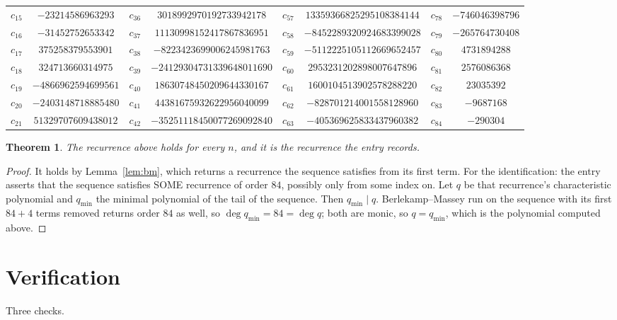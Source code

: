 \documentclass[11pt,a4paper]{article}
\theoremstyle{plain}
\newtheorem{theorem}{Theorem}
\theoremstyle{definition}
\begin{document}
\begin{center}
\begin{tabular}{cccccccc}
$c_{15}$ & $-23214586963293$ & $c_{36}$ & $3018992970192733942178$ & $c_{57}$ & $13359366825295108384144$ & $c_{78}$ & $-746046398796$ \\
$c_{16}$ & $-31452752653342$ & $c_{37}$ & $11130998152417867836951$ & $c_{58}$ & $-8452289320924683399028$ & $c_{79}$ & $-265764730408$ \\
$c_{17}$ & $375258379553901$ & $c_{38}$ & $-8223423699006245981763$ & $c_{59}$ & $-5112225105112669652457$ & $c_{80}$ & $4731894288$ \\
$c_{18}$ & $324713660314975$ & $c_{39}$ & $-24129304731339648011690$ & $c_{60}$ & $2953231202898007647896$ & $c_{81}$ & $2576086368$ \\
$c_{19}$ & $-4866962594699561$ & $c_{40}$ & $18630748450209644330167$ & $c_{61}$ & $1600104513902578288220$ & $c_{82}$ & $23035392$ \\
$c_{20}$ & $-2403148718885480$ & $c_{41}$ & $44381675932622956040099$ & $c_{62}$ & $-828701214001558128960$ & $c_{83}$ & $-9687168$ \\
$c_{21}$ & $51329707609438012$ & $c_{42}$ & $-35251118450077269092840$ & $c_{63}$ & $-405369625833437960382$ & $c_{84}$ & $-290304$ \\
\end{tabular}
\end{center}

\begin{theorem}
The recurrence above holds for every $n$, and it is the recurrence the entry records.
\end{theorem}

\begin{proof}
It holds by Lemma~\ref{lem:bm}, which returns a recurrence the sequence satisfies from its
first term. For the identification: the entry asserts that the sequence satisfies SOME
recurrence of order $84$, possibly only from some index on. Let $q$ be that recurrence's
characteristic polynomial and $q_{\min}$ the minimal polynomial of the tail of the sequence.
Then $q_{\min}\mid q$. Berlekamp--Massey run on the sequence with its first $84+4$ terms
removed returns order $84$ as well, so $\deg q_{\min}=84=\deg q$; both are monic, so
$q=q_{\min}$, which is the polynomial computed above.
\end{proof}

\section{Verification}

Three checks.
\end{document}
